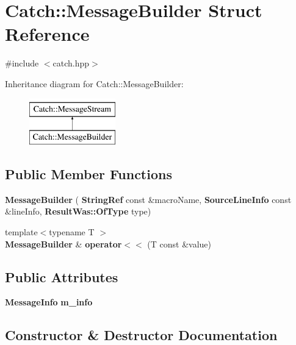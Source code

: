 \section{Catch\+::Message\+Builder Struct Reference}
\label{struct_catch_1_1_message_builder}


{\ttfamily \#include $<$catch.\+hpp$>$}

Inheritance diagram for Catch\+::Message\+Builder\+:\begin{figure}[H]
\begin{center}
\leavevmode
\includegraphics[height=2.000000cm]{struct_catch_1_1_message_builder}
\end{center}
\end{figure}
\subsection*{Public Member Functions}
\begin{DoxyCompactItemize}
\item 
\textbf{ Message\+Builder} (\textbf{ String\+Ref} const \&macro\+Name, \textbf{ Source\+Line\+Info} const \&line\+Info, \textbf{ Result\+Was\+::\+Of\+Type} type)
\item 
{\footnotesize template$<$typename T $>$ }\\\textbf{ Message\+Builder} \& \textbf{ operator$<$$<$} (T const \&value)
\end{DoxyCompactItemize}
\subsection*{Public Attributes}
\begin{DoxyCompactItemize}
\item 
\textbf{ Message\+Info} \textbf{ m\+\_\+info}
\end{DoxyCompactItemize}


\subsection{Constructor \& Destructor Documentation}
\mbox{\label{struct_catch_1_1_message_builder_ac34832ca527a758f000ac233d32dd068}} 
